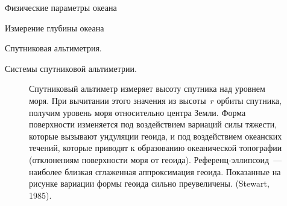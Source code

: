 \begin{chapter}{Физические параметры океана}
\begin{section}{Измерение глубины океана}
\begin{paragraph}{Спутниковая альтиметрия.}
\begin{subparagraph}{Системы спутниковой альтиметрии.}
\begin{figure}[t!]
\caption{Спутниковый альтиметр измеряет высоту спутника над уровнем моря. 
При вычитании этого значения из высоты~$r$ орбиты спутника,
получим уровень моря относительно центра Земли. Форма поверхности
изменяется под воздействием вариаций силы тяжести, которые вызывают
ундуляции геоида, и под воздействием океанских течений, которые
приводят к образованию океанической топографии (отклонениям поверхности моря 
от геоида). Референц-эллипсоид~--- наиболее близкая сглаженная аппроксимация 
геоида. Показанные на рисунке вариации формы геоида сильно преувеличены.
(Stewart, 1985).}
\label{fig:altimetersketch}
\end{figure}
%


\end{subparagraph}
\end{paragraph}
\end{section}
\end{chapter}
